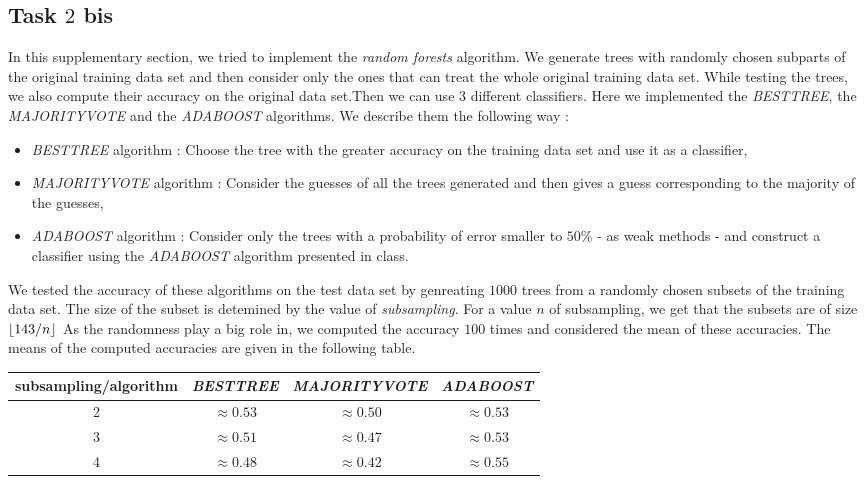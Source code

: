 \documentclass[french]{article}
\DeclarePairedDelimiter\floor{\lfloor}{\rfloor}
\begin{document}
\subsection{Task $2$ bis}
	In this supplementary section, we tried to implement the \emph{random forests} algorithm. We generate trees with randomly chosen subparts of the original training data set and then consider only the ones that can treat the whole original training data set. While testing the trees, we also compute their accuracy on the original data set.Then we can use $3$ different classifiers. Here we implemented the \emph{BESTTREE}, the \emph{MAJORITYVOTE} and the \emph{ADABOOST} algorithms. We describe them the following way :
	\begin{itemize}
		\item \emph{BESTTREE} algorithm : Choose the tree with the greater accuracy on the training data set and use it as a classifier,
		\item \emph{MAJORITYVOTE} algorithm : Consider the guesses of all the trees generated and then gives a guess corresponding to the majority of the guesses,
		\item \emph{ADABOOST} algorithm : Consider only the trees with a probability of error smaller to $50\%$  - as weak methods - and construct a classifier using the \emph{ADABOOST} algorithm presented in class.
	\end{itemize}
	We tested the accuracy of these algorithms on the test data set by genreating $1000$ trees from a randomly chosen subsets of the training data set. The size of the subset is detemined by the value of \emph{subsampling}. For a value $n$ of subsampling, we get that the subsets are of size $\floor{143/n}$ As the randomness play a big role in, we computed the accuracy $100$ times and considered the mean of these accuracies. The means of the computed accuracies are given in the following table.
	\begin{center}
		\begin{tabular}{ |c|c|c|c| }
			\hline
			subsampling/algorithm& \emph{BESTTREE} & \emph{MAJORITYVOTE} & \emph{ADABOOST}\\
			\hline
			2 & $\approx 0.53$  & $\approx 0.50$ & $\approx 0.53$ \\
			\hline
			3 & $\approx 0.51 $ & $\approx 0.47$ & $\approx 0.53$ \\
			\hline
			4 & $\approx 0.48$ & $\approx 0.42$ & $\approx 0.55$\\
			\hline
		\end{tabular}
	\end{center}
\end{document}

